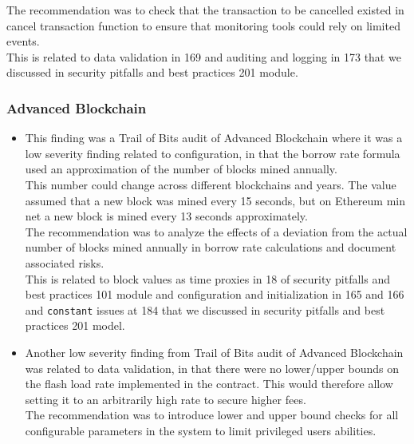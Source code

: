 \begin{itemize}
  The recommendation was to check that the transaction to be cancelled
  existed in cancel transaction function to ensure that monitoring tools
  could rely on limited events.\\

  This is related to data validation in 169 and auditing and logging in
  173 that we discussed in security pitfalls and best practices 201
  module.
\end{itemize}

\subsubsection{Advanced Blockchain}\label{advanced-blockchain}

\begin{itemize}
\item
  This finding was a Trail of Bits audit of Advanced Blockchain where it
  was a low severity finding related to configuration, in that the
  borrow rate formula used an approximation of the number of blocks
  mined annually.\\

  This number could change across different blockchains and years. The
  value assumed that a new block was mined every 15 seconds, but on
  Ethereum min net a new block is mined every 13 seconds
  approximately.\\

  The recommendation was to analyze the effects of a deviation from the
  actual number of blocks mined annually in borrow rate calculations and
  document associated risks.\\

  This is related to block values as time proxies in 18 of security
  pitfalls and best practices 101 module and configuration and
  initialization in 165 and 166 and \texttt{constant} issues at 184 that
  we discussed in security pitfalls and best practices 201 model.
\item
  Another low severity finding from Trail of Bits audit of Advanced
  Blockchain was related to data validation, in that there were no
  lower/upper bounds on the flash load rate implemented in the contract.
  This would therefore allow setting it to an arbitrarily high rate to
  secure higher fees.\\

  The recommendation was to introduce lower and upper bound checks for
  all configurable parameters in the system to limit privileged users
  abilities.\\


\end{itemize}
